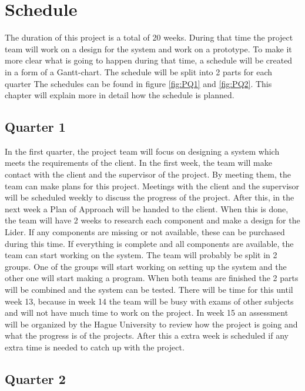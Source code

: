 \chapter{Schedule}
\justify
The duration of this project is a total of 20 weeks. During that time the project team will work on a design for the system and work on a prototype. To make it more clear what is going to happen during that time, a schedule will be created in a form of a Gantt-chart. The schedule will be split into 2 parts for each quarter The schedules can be found in figure \ref{fig:PQ1} and \ref{fig:PQ2}. This chapter will explain more in detail how the schedule is planned.

\section{Quarter 1}
\justify

In the first quarter, the project team will focus on designing a system which meets the requirements of the client. In the first week, the team will make contact with the client and the supervisor of the project. By meeting them, the team can make plans for this project. Meetings with the client and the supervisor will be scheduled weekly to discuss the progress of the project. After this, in the next week a Plan of Approach will be handed to the client. When this is done, the team will have 2 weeks to research each component and make a design for the Lider. If any components are missing or not available, these can be purchased during this time. If everything is complete and all components are available, the team can start working on the system. The team will probably be split in 2 groups. One of the groups will start working on setting up the system and the other one will start making a program. When both teams are finished the 2 parts will be combined and the system can be tested. There will be time for this until week 13, because in week 14 the team will be busy with exams of other subjects and will not have much time to work on the project. In week 15 an assessment will be organized by the Hague University to review how the project is going and what the progress is of the projects. After this a extra week is scheduled if any extra time is needed to catch up with the project.

\section{Quarter 2}

